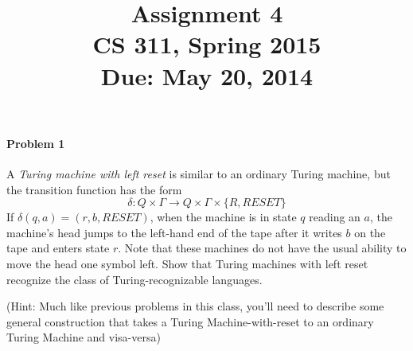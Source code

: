 \documentclass{article}
\title{\vspace{-3ex} \bf Assignment 4 \\[1ex]\rm\normalsize CS 311, Spring 2015 \\ Due: May 20, 2014}
\date{}
\author{}
\begin{document}
\maketitle
\paragraph{Problem 1}
 A {\em Turing machine with left reset} is similar to an ordinary Turing machine, but the 
 transition function has the form
  \begin{displaymath}
    \delta : Q \times \Gamma \to Q \times \Gamma \times \{R,RESET\}
  \end{displaymath}
If $\delta (q,a) = (r,b,RESET)$, when the machine is in state $q$ reading an $a$, the machine's 
head jumps to the left-hand end of the tape after it writes $b$ on the tape and enters state 
$r$. Note that these machines do not have the usual ability to move the head one symbol left. 
Show that Turing machines with left reset recognize the class of Turing-recognizable languages.

  (Hint: Much like previous problems in this class, you'll need to describe some general 
  construction that takes a Turing Machine-with-reset to an ordinary Turing Machine and visa-versa)
\end{document}
